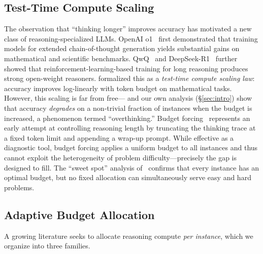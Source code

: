 
\subsection{Test-Time Compute Scaling}
\label{sec:related:ttc}

The observation that ``thinking longer'' improves accuracy has motivated a new class of reasoning-specialized LLMs.
OpenAI o1~\citep{openai2024o1} first demonstrated that training models for extended chain-of-thought generation yields substantial gains on mathematical and scientific benchmarks.
QwQ~\citep{qwq2024} and DeepSeek-R1~\citep{deepseekr1} further showed that reinforcement-learning-based training for long reasoning produces strong open-weight reasoners.
\citet{snell2024scaling} formalized this as a \emph{test-time compute scaling law}: accuracy improves log-linearly with token budget on mathematical tasks.
However, this scaling is far from free---\citet{chen2024overthinking} and our own analysis (\S\ref{sec:intro}) show that accuracy \emph{degrades} on a non-trivial fraction of instances when the budget is increased, a phenomenon termed ``overthinking.''
Budget forcing~\citep{muennighoff2025s1} represents an early attempt at controlling reasoning length by truncating the thinking trace at a fixed token limit and appending a wrap-up prompt.
While effective as a diagnostic tool, budget forcing applies a uniform budget to all instances and thus cannot exploit the heterogeneity of problem difficulty---precisely the gap \method{} is designed to fill.
The ``sweet spot'' analysis of~\citet{chen2024overthinking} confirms that every instance has an optimal budget, but no fixed allocation can simultaneously serve easy and hard problems.

\subsection{Adaptive Budget Allocation}
\label{sec:related:adaptive}

A growing literature seeks to allocate reasoning compute \emph{per instance}, which we organize into three families.

